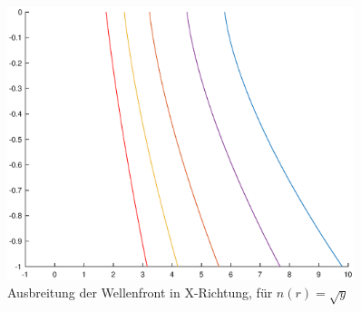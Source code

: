 \begin{refsection}
\begin{figure}
  \centering
  \includegraphics[width=0.9\textwidth]{adaptiv/images/plotwf2}
  \caption{Ausbreitung der Wellenfront in X-Richtung, für $n(r)=\sqrt{y}$}
  \label{fig:plotwf2}
\end{figure}

\printbibliography[heading=subbibliography]
\end{refsection}















